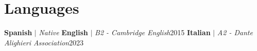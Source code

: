 \section{Languages}
\resumeSubHeadingListStart
    \resumeProjectHeading
        {\textbf{Spanish} $|$ \emph{Native}}{}
    \resumeProjectHeading
        {\textbf{English} $|$ \emph{B2 - Cambridge English}}{2015}
    \resumeProjectHeading
        {\textbf{Italian} $|$ \emph{A2 - Dante Alighieri Association}}{2023}
  \resumeSubHeadingListEnd
